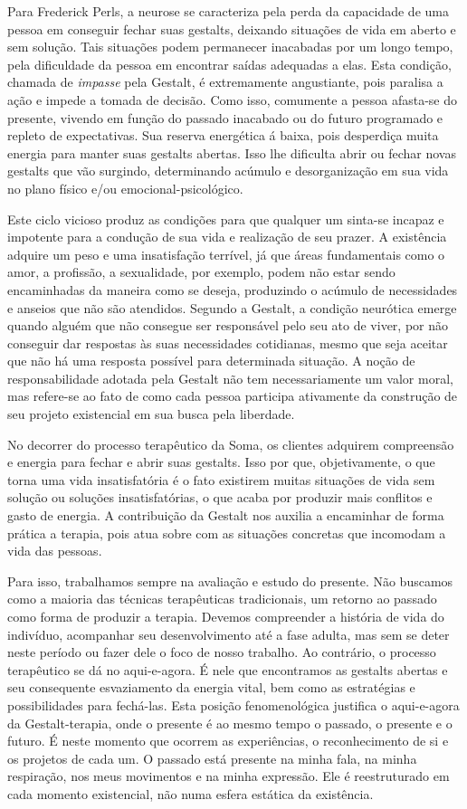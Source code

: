 Para Frederick Perls, a neurose se caracteriza pela perda da capacidade
de uma pessoa em conseguir fechar suas gestalts, deixando situações de
vida em aberto e sem solução. Tais situações podem permanecer inacabadas
por um longo tempo, pela dificuldade da pessoa em encontrar saídas
adequadas a elas. Esta condição, chamada de \emph{impasse} pela Gestalt,
é extremamente angustiante, pois paralisa a ação e impede a tomada de
decisão. Como isso, comumente a pessoa afasta-se do presente, vivendo em
função do passado inacabado ou do futuro programado e repleto de
expectativas. Sua reserva energética á baixa, pois desperdiça muita
energia para manter suas gestalts abertas. Isso lhe dificulta abrir ou
fechar novas gestalts que vão surgindo, determinando acúmulo e
desorganização em sua vida no plano físico e/ou emocional-psicológico.

Este ciclo vicioso produz as condições para que qualquer um sinta-se
incapaz e impotente para a condução de sua vida e realização de seu
prazer. A existência adquire um peso e uma insatisfação terrível, já que
áreas fundamentais como o amor, a profissão, a sexualidade, por exemplo,
podem não estar sendo encaminhadas da maneira como se deseja, produzindo
o acúmulo de necessidades e anseios que não são atendidos. Segundo a
Gestalt, a condição neurótica emerge quando alguém que não consegue ser
responsável pelo seu ato de viver, por não conseguir dar respostas às
suas necessidades cotidianas, mesmo que seja aceitar que não há uma
resposta possível para determinada situação. A noção de responsabilidade
adotada pela Gestalt não tem necessariamente um valor moral, mas
refere-se ao fato de como cada pessoa participa ativamente da construção
de seu projeto existencial em sua busca pela liberdade.

No decorrer do processo terapêutico da Soma, os clientes adquirem
compreensão e energia para fechar e abrir suas gestalts. Isso por que,
objetivamente, o que torna uma vida insatisfatória é o fato existirem
muitas situações de vida sem solução ou soluções insatisfatórias, o que
acaba por produzir mais conflitos e gasto de energia. A contribuição da
Gestalt nos auxilia a encaminhar de forma prática a terapia, pois atua
sobre com as situações concretas que incomodam a vida das pessoas.

Para isso, trabalhamos sempre na avaliação e estudo do presente. Não
buscamos como a maioria das técnicas terapêuticas tradicionais, um
retorno ao passado como forma de produzir a terapia. Devemos compreender
a história de vida do indivíduo, acompanhar seu desenvolvimento até a
fase adulta, mas sem se deter neste período ou fazer dele o foco de
nosso trabalho. Ao contrário, o processo terapêutico se dá no
aqui-e-agora. É nele que encontramos as gestalts abertas e seu
consequente esvaziamento da energia vital, bem como as estratégias e
possibilidades para fechá-las. Esta posição fenomenológica justifica o
aqui-e-agora da Gestalt-terapia, onde o presente é ao mesmo tempo o
passado, o presente e o futuro. É neste momento que ocorrem as
experiências, o reconhecimento de si e os projetos de cada um. O passado
está presente na minha fala, na minha respiração, nos meus movimentos e
na minha expressão. Ele é reestruturado em cada momento existencial, não
numa esfera estática da existência.

